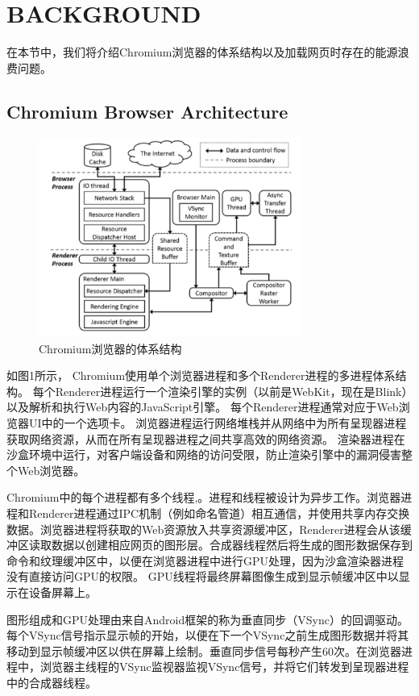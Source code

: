 \documentclass{sig-alternate-05-2015}
\begin{document}
\section{BACKGROUND} 

在本节中，我们将介绍Chromium浏览器的体系结构以及加载网页时存在的能源浪费问题。

\subsection{Chromium Browser Architecture}

\begin{figure}[htbp]
	\centering
	\includegraphics[width=3.4in]{./figure1}
	\caption{Chromium浏览器的体系结构}\label{fig:tasks}
\end{figure}

如图1所示， Chromium使用单个浏览器进程和多个Renderer进程的多进程体系结构。 每个Renderer进程运行一个渲染引擎的实例（以前是WebKit\cite{4}，现在是Blink\cite{5}）以及解析和执行Web内容的JavaScript引擎。 每个Renderer进程通常对应于Web浏览器UI中的一个选项卡。 浏览器进程运行网络堆栈并从网络中为所有呈现器进程获取网络资源，从而在所有呈现器进程之间共享高效的网络资源。 渲染器进程在沙盒环境中运行，对客户端设备和网络的访问受限，防止渲染引擎中的漏洞侵害整个Web浏览器。

Chromium中的每个进程都有多个线程,。进程和线程被设计为异步工作。浏览器进程和Renderer进程通过IPC机制（例如命名管道）相互通信，并使用共享内存交换数据。浏览器进程将获取的Web资源放入共享资源缓冲区，Renderer进程会从该缓冲区读取数据以创建相应网页的图形层。合成器线程然后将生成的图形数据保存到命令和纹理缓冲区中，以便在浏览器进程中进行GPU处理，因为沙盒渲染器进程没有直接访问GPU的权限。 GPU线程将最终屏幕图像生成到显示帧缓冲区中以显示在设备屏幕上。

图形组成和GPU处理由来自Android框架的称为垂直同步（VSync）的回调驱动。每个VSync信号指示显示帧的开始，以便在下一个VSync之前生成图形数据并将其移动到显示帧缓冲区以供在屏幕上绘制。垂直同步信号每秒产生60次。在浏览器进程中，浏览器主线程的VSync监视器监视VSync信号，并将它们转发到呈现器进程中的合成器线程。
\end{document}
